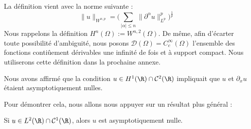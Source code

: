 La définition vient avec la norme suivante :
$$\|u\|_{W^{n,p}} = \bigg( \sum_{| \alpha | \leq n} \| \partial^{\alpha} u \|_{L^p}^p \bigg)^{\frac{1}{p}} $$
Nous rappelons la définition $H^n(\Omega) := W^{n,2}(\Omega)$.
De même, afin d'écarter toute possibilité d'ambiguité, nous posons $\mathcal{D}(\Omega) = C^{\infty}_c(\Omega)$ l'ensemble des fonctions contiûement dérivables une infinité de fois et à support compact.
Nous utiliserons cette définition dans la prochaine annexe.
\vspace{1em}

Nous avons affirmé que la condition $u \in H^1(\R) \cap \mathcal{C}^2(\R)$ impliquait que $u$ et $\partial_x u$ étaient asymptotiquement nulles.

Pour démontrer cela, nous allons nous appuyer sur un résultat plus général :
\begin{lemmabox}
\begin{lemma}
    Si $u \in L^2(\R) \cap \mathcal{C}^1(\R)$, alors $u$ est asymptotiquement nulle.
\end{lemma}
\end{lemmabox}

